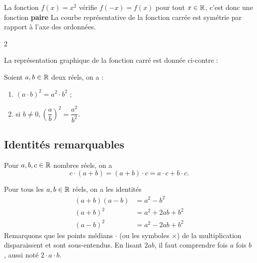 \documentclass[a4paper, 12pt]{report}
\begin{document}
\begin{coro}
	La fonction $f(x) = x^2$ vérifie $f(-x)=f(x)$ pour tout $x\in\mathbb{R}$, c'est donc une fonction \textbf{paire}
	La courbe représentative de la fonction carrée est symétrie par rapport à l'axe des ordonnées.
\end{coro}

\begin{rmq}
\begin{multicols}{2}
\begin{flushleft}
La représentation graphique de la fonction carré est donnée ci-contre :
\end{flushleft}
\end{multicols}
\end{rmq}

\begin{thm}
	Soient $a, b \in\mathbb{R}$ deux réels, on a :
		\begin{enumerate}[label=(\roman*)]
			\item $(a \cdot b)^2 = a^2 \cdot b^2$ ;
			\item si $b \neq 0, \left(\dfrac{a}{b}\right)^2 = \dfrac{a^2}{b^2}$.
		\end{enumerate}
\end{thm}

\subsection{Identités remarquables}

\begin{ax}[Distributivité]
Pour $a,b,c\in\mathbb{R}$ nombres réels, on a
		\[ c \cdot (a+b) = (a+b) \cdot c = a\cdot c + b \cdot c. \]
\end{ax}

\begin{thm}
	Pour tous les $a,b\in\mathbb{R}$ réels, on a les identités
		\begin{align*}
			(a+b)(a-b) &= a^2 - b^2 \\
			(a+b)^2 &= a^2 + 2ab + b^2 \\
			(a-b)^2 &= a^2 - 2ab + b^2
		\end{align*}
	Remarquons que les points médians $\cdot$ (ou les symboles $\times$) de la multiplication disparaissent et sont sous-entendus.
	En lisant $2ab$, il faut comprendre  fois $a$ fois $b$ \fg, aussi noté $2\cdot a \cdot b$.
\end{thm}
\end{document}
